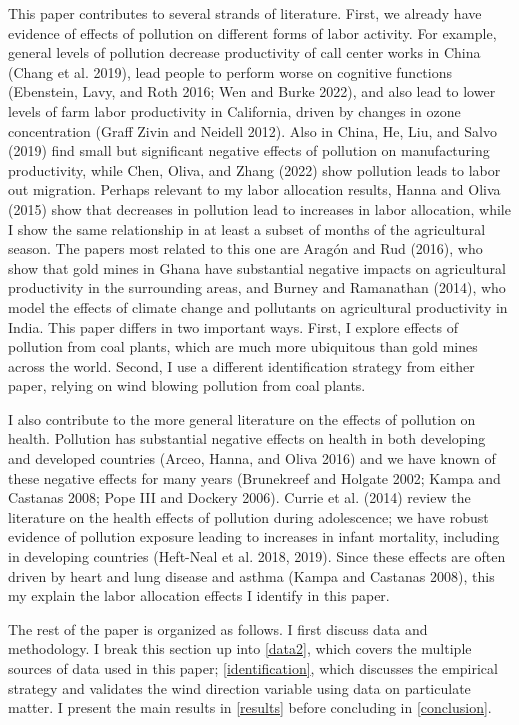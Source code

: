 \documentclass[
]{article}
\begin{document}
This paper contributes to several strands of literature. First, we already have evidence of effects of pollution on different forms of labor activity. For example, general levels of pollution decrease productivity of call center works in China (Chang et al. 2019), lead people to perform worse on cognitive functions (Ebenstein, Lavy, and Roth 2016; Wen and Burke 2022), and also lead to lower levels of farm labor productivity in California, driven by changes in ozone concentration (Graff Zivin and Neidell 2012). Also in China, He, Liu, and Salvo (2019) find small but significant negative effects of pollution on manufacturing productivity, while Chen, Oliva, and Zhang (2022) show pollution leads to labor out migration. Perhaps relevant to my labor allocation results, Hanna and Oliva (2015) show that decreases in pollution lead to increases in labor allocation, while I show the same relationship in at least a subset of months of the agricultural season. The papers most related to this one are Aragón and Rud (2016), who show that gold mines in Ghana have substantial negative impacts on agricultural productivity in the surrounding areas, and Burney and Ramanathan (2014), who model the effects of climate change and pollutants on agricultural productivity in India. This paper differs in two important ways. First, I explore effects of pollution from coal plants, which are much more ubiquitous than gold mines across the world. Second, I use a different identification strategy from either paper, relying on wind blowing pollution from coal plants.

I also contribute to the more general literature on the effects of pollution on health. Pollution has substantial negative effects on health in both developing and developed countries (Arceo, Hanna, and Oliva 2016) and we have known of these negative effects for many years (Brunekreef and Holgate 2002; Kampa and Castanas 2008; Pope III and Dockery 2006). Currie et al. (2014) review the literature on the health effects of pollution during adolescence; we have robust evidence of pollution exposure leading to increases in infant mortality, including in developing countries (Heft-Neal et al. 2018, 2019). Since these effects are often driven by heart and lung disease and asthma (Kampa and Castanas 2008), this my explain the labor allocation effects I identify in this paper.

The rest of the paper is organized as follows. I first discuss data and methodology. I break this section up into \autoref{data2}, which covers the multiple sources of data used in this paper; \autoref{identification}, which discusses the empirical strategy and validates the wind direction variable using data on particulate matter. I present the main results in \autoref{results} before concluding in \autoref{conclusion}.
\end{document}
